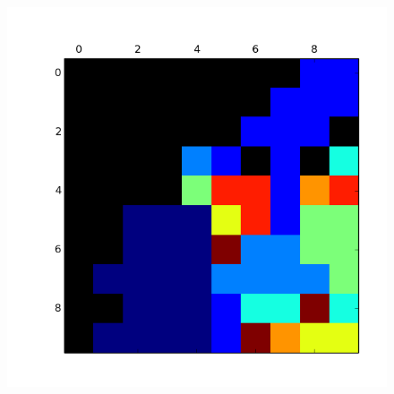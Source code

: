 \begin{figure}[h!]
\begin{minipage}{.15\textwidth}
  \label{fig:test2}
\end{minipage}
\begin{minipage}{.15\textwidth}
  \centering
  \includegraphics[width=.9\linewidth]{img/convergencia_kohonen/entrenamiento_100.png}
  \label{fig:test2}
\end{minipage}
\end{figure}